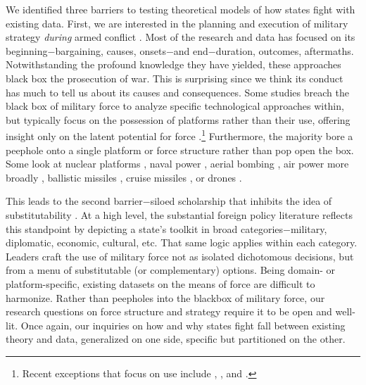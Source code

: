 \documentclass[fleqn,12pt]{article}
\begin{document}
We identified three barriers to testing theoretical models of how states fight with existing data. First, we are interested in the planning and execution of military strategy \textit{during} armed conflict \citep{wallace_alliancesinstitutionaldesign_2008}. Most of the research and data has focused on its beginning$-$bargaining, causes, onsets$-$and end$-$duration, outcomes, aftermaths. Notwithstanding the profound knowledge they have yielded, these approaches black box the prosecution of war. This is surprising since we think its conduct has much to tell us about its causes and consequences. Some studies breach the black box of military force to analyze specific technological approaches within, but typically focus on the possession of platforms rather than their use, offering insight only on the latent potential for force \citep{gannon_planestrainsarmored_2021}.\footnote{Recent exceptions that focus on use include \citet{martinezmachain_aircampaignduration_2015}, \citet{post_flyingfailcostly_2019}, and \citet{gannon_oneifland_2022a}.} Furthermore, the majority bore a peephole onto a single platform or force structure rather than pop open the box. Some look at nuclear platforms \citep{gartzke_determinantsnuclearforce_2014}, naval power \citep{crisher_powerseanaval_2014}, aerial bombing \citep{pape_bombingwinair_1996}, air power more broadly \citep{horowitz_whendoesaerial_2001, martinezmachain_aircampaignduration_2015, allen_understandingimpactair_2017}, ballistic missiles \citep{reiter_ballisticmissilesinternational_2013}, cruise missiles \citep{early_climbingladderexplaining_2022}, or drones \citep{fuhrmann_droningexplainingproliferation_2017}.

This leads to the second barrier$-$siloed scholarship that inhibits the idea of substitutability \citep{morgan_modelforeignpolicy_2000}. At a high level, the substantial foreign policy literature reflects this standpoint by depicting a state's toolkit in broad categories$-$military, diplomatic, economic, cultural, etc. That same logic applies within each category. Leaders craft the use of military force not as isolated dichotomous decisions, but from a menu of substitutable (or complementary) options. Being domain- or platform-specific, existing datasets on the means of force are difficult to harmonize. Rather than peepholes into the blackbox of military force, our research questions on force structure and strategy require it to be open and well-lit. Once again, our inquiries on how and why states fight fall between existing theory and data, generalized on one side, specific but partitioned on the other.
\end{document}
